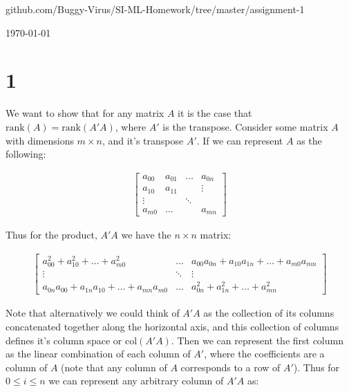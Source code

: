 \documentclass[11pt]{article} %
\newcommand{\problem}[1]{\section{#1}}		%
\begin{document}
\centerline{\LARGE}
\centerline{\LARGE\thishw}
\vspace{2mm} \newline
\centerline{\small github.com/Buggy-Virus/SI-ML-Homework/tree/master/assignment-1}
\centerline{\small\today}

\problem{1}
\begin{enumerate}
    We want to show that for any matrix $A$ it is the case that $\text{rank}(A) = \text{rank}(A'A)$, where $A'$ is the transpose. Consider some matrix $A$ with dimensions $m \times n$, and it's transpose $A'$. If we can represent $A$ as the following:

    \begin{align*}
        \begin{bmatrix}
            a_{00} & a_{01} & \dots  & a_{0n}  \\
            a_{10} & a_{11} &        & \vdots  \\
            \vdots  &       & \ddots &         \\
            a_{m0} & \dots  &        & a_{mn}
        \end{bmatrix}
    \end{align*}

    Thus for the product, $A'A$ we have the $n \times n$ matrix:

    \begin{align*}
        \begin{bmatrix}
            a_{00}^2 + a_{10}^2 + \dots + a_{m0}^2             & \dots  & a_{00}a_{0n} + a_{10}a_{1n} + \dots + a_{m0}a_{mn}  \\
            \vdots                                             & \ddots & \vdots \\
            a_{0n}a_{00} + a_{1n}a_{10} + \dots + a_{mn}a_{m0} & \dots  & a_{0n}^2 + a_{1n}^2 + \dots + a_{mn}^2
        \end{bmatrix}
    \end{align*}

    Note that alternatively we could think of $A'A$ as the collection of its columns concatenated together along the horizontal axis, and this collection of columns defines it's column space or $\text{col}(A'A)$. Then we can represent the first column as the linear combination of each column of $A'$, where the coefficients are a column of $A$ (note that any column of $A$ corresponds to a row of $A'$). Thus for $0 \leq i \leq n$ we can represent any arbitrary column of $A'A$ as:


\end{enumerate}
\end{document}
